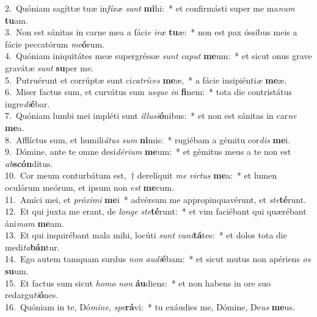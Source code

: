 {2.~}Quóniam sagíttæ tuæ in\textit{fí}\textit{xæ} \textit{sunt} \textbf{mi}hi:~* et confirmásti super me ma\textit{num} \textbf{tu}am.\\
{3.~}Non est sánitas in carne mea a fáci\textit{e} \textit{i}\textit{ræ} \textbf{tu}æ:~* non est pax óssibus meis a fácie peccatórum \textit{me}\textbf{ó}rum.\\
{4.~}Quóniam iniquitátes meæ supergréssæ \textit{sunt} \textit{ca}\textit{put} \textbf{me}um:~* et sicut onus grave gravátæ \textit{sunt} \textbf{su}per me.\\
{5.~}Putruérunt et corrúptæ sunt ci\textit{ca}\textit{trí}\textit{ces} \textbf{me}æ,~* a fácie insipiénti\textit{æ} \textbf{me}æ.\\
{6.~}Miser factus sum, et curvátus sum \textit{us}\textit{que} \textit{in} \textbf{fi}nem:~* tota die contristátus ingre\textit{di}\textbf{é}bar.\\
{7.~}Quóniam lumbi mei impléti sunt \textit{il}\textit{lu}\textit{si}\textbf{ó}nibus:~* et non est sánitas in car\textit{ne} \textbf{me}a.\\
{8.~}Afflíctus sum, et humili\textit{á}\textit{tus} \textit{sum} \textbf{ni}mis:~* rugiébam a gémitu cor\textit{dis} \textbf{me}i.\\
{9.~}Dómine, ante te omne desi\textit{dé}\textit{ri}\textit{um} \textbf{me}um:~* et gémitus meus a te non est \textit{ab}\textbf{scón}ditus.\\
{10.~}Cor meum conturbátum est,~† derelíquit \textit{me} \textit{vir}\textit{tus} \textbf{me}a:~* et lumen oculórum meórum, et ipsum non \textit{est} \textbf{me}cum.\\
{11.~}Amíci mei, et \textit{pró}\textit{xi}\textit{mi} \textbf{me}i~* advérsum me appropinquavérunt, et \textit{ste}\textbf{té}runt.\\
{12.~}Et qui juxta me erant, de \textit{lon}\textit{ge} \textit{ste}\textbf{té}runt:~* et vim faciébant qui quærébant áni\textit{mam} \textbf{me}am.\\
{13.~}Et qui inquirébant mala mihi, locúti \textit{sunt} \textit{va}\textit{ni}\textbf{tá}tes:~* et dolos tota die medi\textit{ta}\textbf{bán}tur.\\
{14.~}Ego autem tamquam surdus \textit{non} \textit{au}\textit{di}\textbf{é}bam:~* et sicut mutus non apériens \textit{os} \textbf{su}um.\\
{15.~}Et factus sum sicut \textit{ho}\textit{mo} \textit{non} \textbf{áu}diens:~* et non habens in ore suo redargu\textit{ti}\textbf{ó}nes.\\
{16.~}Quóniam in te, Dó\textit{mi}\textit{ne}, \textit{spe}\textbf{rá}vi:~* tu exáudies me, Dómine, De\textit{us} \textbf{me}us.\\
